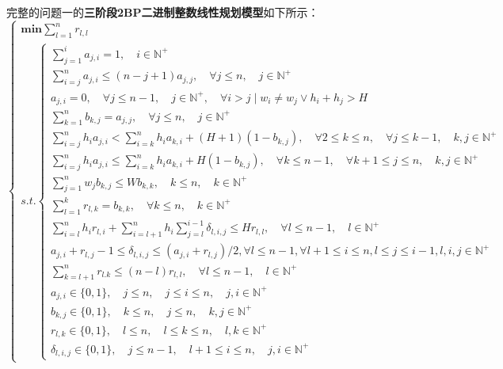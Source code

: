 \documentclass[bwprint]{gmcmthesis}
\begin{document}
完整的问题一的\textbf{三阶段2BP二进制整数线性规划模型}如下所示：
\begin{equation}
    \begin{cases}
        \mathbf{min}  \sum_{l=1}^{n}  r_{l,l} \\
        s.t.
        \begin{cases}
            \sum_{j=1}^{i}  a_{j,i} =1,\quad i \in \mathbb{N}^+ \\
            \sum_{i=j}^{n}  a_{j,i} \le (n-j+1)a_{j,j},\quad \forall j \le n,\quad j \in \mathbb{N}^+ \\
            a_{j,i}=0, \quad \forall j \le n-1,\quad j \in \mathbb{N}^+,\quad  \forall i>j \mid w_i \neq w_j \vee h_i+h_j>H\\
            \sum_{k=1}^{n}  b_{k,j} =a_{j,j},\quad \forall j \le n,\quad j \in \mathbb{N}^+   \\
            \sum_{i=j}^{n} h_ia_{j,i}<\sum_{i=k}^n h_i a_{k,i}+(H+1)(1-b_{k,j}),\quad \forall  2 \le k \le n,\quad \forall j \le k-1, \quad k,j \in \mathbb{N}^+ \\
            \sum_{i=j}^{n} h_ia_{j,i} \le \sum_{i=k}^n h_i a_{k,i}+H(1-b_{k,j}),\quad \forall  k \le n-1, \quad \forall k+1 \le j \le n, \quad k,j \in \mathbb{N}^+ \\
            \sum_{j=1}^{n} w_j b_{k,j} \le W b_{k,k}, \quad k \le n, \quad k \in \mathbb{N}^+ \\
            \sum_{l=1}^{k} r_{l,k} = b_{k,k}, \quad \forall k \le n, \quad k \in \mathbb{N}^+ \\
            \sum_{i=l}^{n} h_i r_{l,i} +\sum_{i=l+1}^{n} h_i \sum_{j=l}^{i-1} \delta_{l,i,j} \le H r_{l,l}, \quad \forall l \le n-1, \quad l \in \mathbb{N}^+ \\
            a_{j,i}+r_{l,j}-1 \le \delta_{l,i,j} \le (a_{j,i}+r_{l,j})/2, \forall l \le n-1, \forall l+1 \le i \le n, l \le j \le i-1, l,i,j \in \mathbb{N}^+ \\
           \sum_{k=l+1}^{n} r_{l.k} \le (n-l)r_{l,l}, \quad \forall l \le n-1, \quad l \in \mathbb{N}^+ \\
            a_{j,i} \in \{0,1\}, \quad j \le n , \quad j \le i \le n, \quad j,i \in \mathbb{N}^+ \\
            b_{k,j} \in \{0,1\},  \quad k \le n , \quad j \le n, \quad k,j \in \mathbb{N}^+ \\
            r_{l,k} \in \{0,1\}, \quad l \le n , \quad l \le k \le n, \quad l,k \in \mathbb{N}^+ \\
            \delta_{l,i,j} \in \{0,1\},  \quad j \le n-1 , \quad l+1 \le i \le n, \quad j,i \in \mathbb{N}^+
        \end{cases}  \label{问题一模型}
    \end{cases}
\end{equation}
\end{document}
